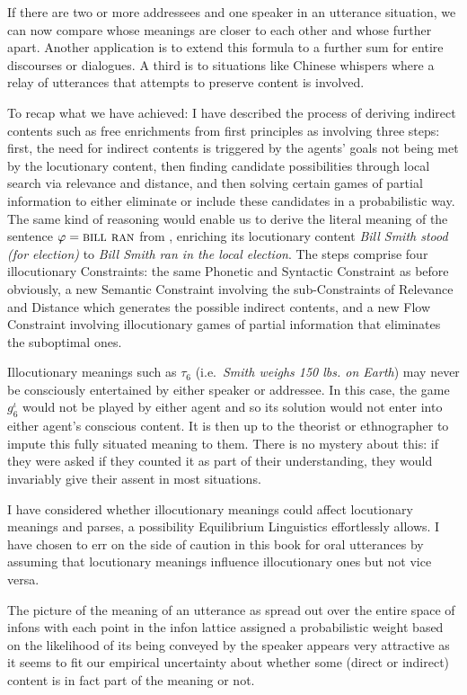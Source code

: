 If there are two or more addressees and one speaker in an utterance situation, we can now compare whose meanings are closer to each other and whose further apart. Another application is to extend this formula to a further sum for entire discourses or dialogues. A third is to situations like Chinese whispers where a relay of utterances that attempts to preserve content is involved.

To recap what we have achieved: I have described the process of deriving indirect contents such as free enrichments from first principles as involving three steps: first, the need for indirect contents is triggered by the agents' goals not being met by the locutionary content, then finding candidate possibilities through local search via relevance and distance, and then solving certain games of partial information to either eliminate or include these candidates in a probabilistic way. The same kind of reasoning would enable us to derive the literal meaning of the sentence $\varphi = \Expression{Bill ran}$ from , enriching its locutionary content \emph{Bill Smith stood (for election)} to \emph{Bill Smith ran in the local election}. The steps comprise four illocutionary Constraints: the same Phonetic and Syntactic Constraint as before obviously, a new Semantic Constraint involving the sub-Constraints of Relevance and Distance which generates the possible indirect contents, and a new Flow Constraint involving illocutionary games of partial information that eliminates the suboptimal ones.

Illocutionary meanings such as $\tau_6$ (i.e.\ \emph{Smith weighs 150 lbs. on Earth}) may never be consciously entertained by either speaker or addressee. In this case, the game $g^\iota_6$ would not be played by either agent and so its solution would not enter into either agent's conscious content. It is then up to the theorist or ethnographer to impute this fully situated meaning to them. There is no mystery about this: if they were asked if they counted it as part of their understanding, they would invariably give their assent in most situations.

I have considered whether illocutionary meanings could affect locutionary meanings and parses, a possibility Equilibrium Linguistics effortlessly allows. I have chosen to err on the side of caution in this book for oral utterances by assuming that locutionary meanings influence illocutionary ones but not vice versa.

The picture of the meaning of an utterance as spread out over the entire space of infons with each point in the infon lattice assigned a probabilistic weight based on the likelihood of its being conveyed by the speaker appears very attractive as it seems to fit our empirical uncertainty about whether some (direct or indirect) content is in fact part of the meaning or not.

